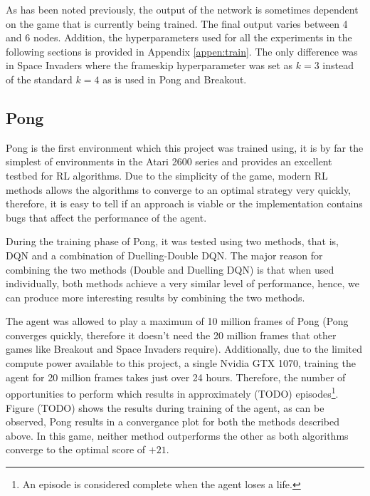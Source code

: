 As has been noted previously, the output of the network is sometimes dependent on the game that is currently being trained. The final output varies between 4 and 6 nodes. Addition, the hyperparameters used for all the experiments in the following sections is provided in Appendix \ref{appen:train}. The only difference was in Space Invaders where the frameskip hyperparameter was set as $k = 3$ instead of the standard $k = 4$ as is used in Pong and Breakout.

\subsection{Pong}
Pong is the first environment which this project was trained using, it is by far the simplest of environments in the Atari 2600 series and provides an excellent testbed for RL algorithms. Due to the simplicity of the game, modern RL methods allows the algorithms to converge to an optimal strategy very quickly, therefore, it is easy to tell if an approach is viable or the implementation contains bugs that affect the performance of the agent.

During the training phase of Pong, it was tested using two methods, that is, DQN and a combination of Duelling-Double DQN. The major reason for combining the two methods (Double and Duelling DQN) is that when used individually, both methods achieve a very similar level of performance, hence, we can produce more interesting results by combining the two methods.

The agent was allowed to play a maximum of 10 million frames of Pong (Pong converges quickly, therefore it doesn't need the 20 million frames that other games like Breakout and Space Invaders require). Additionally, due to the limited compute power available to this project, a single Nvidia GTX 1070, training the agent for 20 million frames takes just over 24 hours. Therefore, the number of opportunities to perform  which results in approximately (TODO) episodes\footnote{An episode is considered complete when the agent loses a life.}. Figure (TODO) shows the results during training of the agent, as can be observed, Pong results in a convergance plot for both the methods described above. In this game, neither method outperforms the other as both algorithms converge to the optimal score of $+21$.

